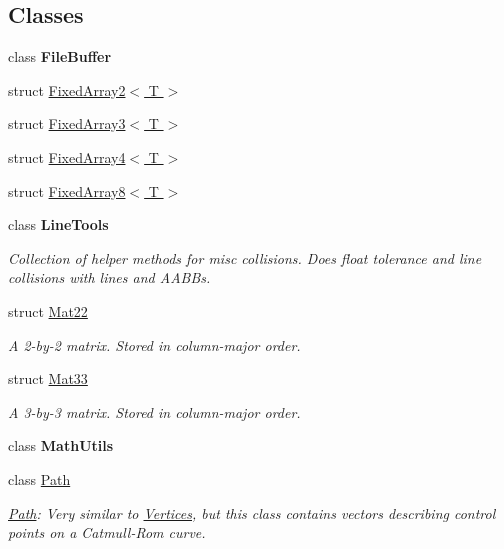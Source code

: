 \subsection*{Classes}
\begin{DoxyCompactItemize}
\item 
class {\bfseries File\+Buffer}
\item 
struct \hyperlink{struct_farseer_physics_1_1_common_1_1_fixed_array2_3_01_t_01_4}{Fixed\+Array2$<$ T $>$}
\item 
struct \hyperlink{struct_farseer_physics_1_1_common_1_1_fixed_array3_3_01_t_01_4}{Fixed\+Array3$<$ T $>$}
\item 
struct \hyperlink{struct_farseer_physics_1_1_common_1_1_fixed_array4_3_01_t_01_4}{Fixed\+Array4$<$ T $>$}
\item 
struct \hyperlink{struct_farseer_physics_1_1_common_1_1_fixed_array8_3_01_t_01_4}{Fixed\+Array8$<$ T $>$}
\item 
class {\bfseries Line\+Tools}
\begin{DoxyCompactList}\small\item\em Collection of helper methods for misc collisions. Does float tolerance and line collisions with lines and A\+A\+B\+Bs. \end{DoxyCompactList}\item 
struct \hyperlink{struct_farseer_physics_1_1_common_1_1_mat22}{Mat22}
\begin{DoxyCompactList}\small\item\em A 2-\/by-\/2 matrix. Stored in column-\/major order. \end{DoxyCompactList}\item 
struct \hyperlink{struct_farseer_physics_1_1_common_1_1_mat33}{Mat33}
\begin{DoxyCompactList}\small\item\em A 3-\/by-\/3 matrix. Stored in column-\/major order. \end{DoxyCompactList}\item 
class {\bfseries Math\+Utils}
\item 
class \hyperlink{class_farseer_physics_1_1_common_1_1_path}{Path}
\begin{DoxyCompactList}\small\item\em \hyperlink{class_farseer_physics_1_1_common_1_1_path}{Path}\+: Very similar to \hyperlink{class_farseer_physics_1_1_common_1_1_vertices}{Vertices}, but this class contains vectors describing control points on a Catmull-\/\+Rom curve. \end{DoxyCompactList}\item 

\end{DoxyCompactItemize}
